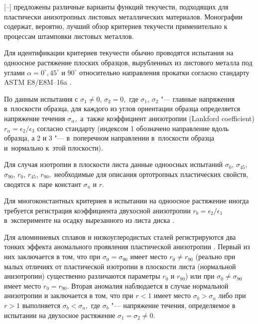[--] предложены различные варианты функций текучести, подходящих для пластически анизотропных листовых металлических материалов. Монографии \cite{keller:bib:banabic,  keller:bib:banabic2016} содержат, вероятно, лучший обзор критериев текучести применительно к процессам штамповки листовых металлов. 



Для идентификации критериев текучести обычно проводятся испытания на одноосное растяжение плоских образцов, вырубленных из листового металла под углами $\alpha=0^{\circ}, 45^{\circ}$ и $90^{\circ}$ относительно направления прокатки согласно стандарту ASTM E8/E8M--16a \cite{keller:bib:astmtt}. 

По данным испытания с ${\sigma_1\neq 0}$, $\sigma_2=0,$ где $\sigma_1$, $\sigma_2$ "--- главные напряжения в~плоскости образца, для каждого из углов ориентации образца определяется напряжение течения $\sigma_{\alpha},$ а~также коэффициент анизотропии (Lankford coefficient) $r_{\alpha}=\epsilon_{2}/\epsilon_{3}$ согласно стандарту \cite{keller:bib:astmr} (индексом 1 обозначено направление вдоль образца, а 2 и 3 "--- в~поперечном направлении в~плоскости образца и~нормально к~этой плоскости). 

Для случая изотропии в плоскости листа данные одноосных испытаний $\sigma_{0}$, $\sigma_{45}$, $\sigma_{90}$, $r_{0}$, $r_{45}$, $r_{90},$ необходимые для описания ортотропных пластических свойств, сводятся к~паре констант $\sigma_{u}$ и $r.$ 

Для многоконстантных критериев в испытании на одноосное растяжение иногда требуется регистрация коэффициента двухосной анизотропии $r_b=\epsilon_2/\epsilon_1$ в~эксперименте на осадку вырезанного из листа диска \cite{keller:bib:banabic}.





Для  алюминиевых сплавов и низкоуглеродистых сталей регистрируются два тонких эффекта аномального проявления пластической анизотропии \cite{keller:bib:banabic}. Первый из них заключается в том, что при $\sigma_{0}=\sigma_{90}$ имеет место $r_{0}\neq r_{90}$ (реально при малых отличиях от пластической изотропии в плоскости листа (нормальной анизотропии) существенно различаются параметры $r_{0}$ и $r_{90}$) или при $\sigma_{0}\neq\sigma_{90}$ имеет место $r_{0}=r_{90}.$ Вторая аномалия наблюдается в случае нормальной анизотропии и заключается в том, что  при $r<1$ имеет место $\sigma_{b}>\sigma_{u}$ либо при $r>1$ выполняется $\sigma_{b}<\sigma_{u},$ где $\sigma_{b}$ "--- напряжение течения, определяемое в испытании на двухосное растяжение $\sigma_1=\sigma_2\neq 0.$





